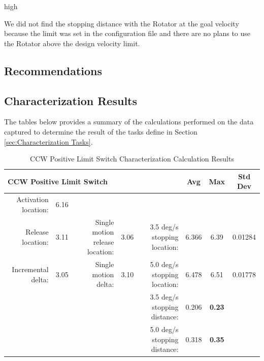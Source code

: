 high\documentclass[SE,lsstdraft,authoryear,toc]{lsstdoc}
\begin{document}
We did not find the stopping distance with the Rotator at the goal
velocity because the limit was set in the configuration file and there
are no plans to use the Rotator above the design velocity limit.

\begin{landscape}
\section{Recommendations}

\subsection{Characterization Results}

The tables below provides a summary of the calculations performed on the
data captured to determine the result of the tasks define in Section \ref{sec:Characterization Tasks}.

\begin{table}[h!]
  \begin{center}
    \caption{CCW Positive Limit Switch Characterization Calculation Results}
    \label{tab:table1}
    \begin{tabular}{r|c|r|c|r|c|c|c}
    \multicolumn{5}{l|}{\textbf{CCW Positive Limit Switch}} & Avg & Max & Std Dev\\
    \midrule
    Activation location: & 6.16 & & & & & & \\
    Release location: & 3.11 & Single motion release location: & 3.06 & 3.5
    deg/s stopping location: & 6.366 & 6.39 & 0.01284 \\
    Incremental delta: & 3.05 & Single motion delta: & 3.10 & 5.0 deg/s
    stopping location: & 6.478 & 6.51 & 0.01778 \\
    & & & & 3.5 deg/s stopping distance: & 0.206 & \textbf{0.23} & \\
    & & & & 5.0 deg/s stopping distance: & 0.318 & \textbf{0.35} & \\
    \end{tabular}
  \end{center}
\end{table}


\end{landscape}
\end{document}
